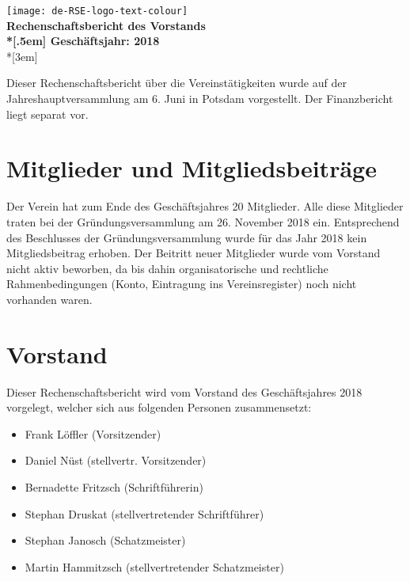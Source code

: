 \newcommand{\jahr}{2018}



\thispagestyle{empty}

\begin{centering}
\texttt{[image: de-RSE-logo-text-colour]}\\
\vspace{3em}
\textbf{
 \Large Rechenschaftsbericht des Vorstands\\*[.5em]
 \normalsize Geschäftsjahr: \jahr}\\*[3em]
\end{centering}



Dieser Rechenschaftsbericht über die Vereinstätigkeiten wurde auf der Jahreshauptversammlung am 6. Juni in Potsdam vorgestellt.
Der Finanzbericht liegt separat vor.

\section{Mitglieder und Mitgliedsbeiträge}

Der Verein hat zum Ende des Geschäftsjahres 20 Mitglieder.
Alle diese Mitglieder traten bei der Gründungsversammlung am 26. November 2018 ein.
Entsprechend des Beschlusses der Gründungsversammlung wurde für das Jahr 2018 kein Mitgliedsbeitrag erhoben.
Der Beitritt neuer Mitglieder wurde vom Vorstand nicht aktiv beworben, da bis dahin organisatorische und rechtliche Rahmenbedingungen (Konto, Eintragung ins Vereinsregister) noch nicht vorhanden waren.

\section{Vorstand}

Dieser Rechenschaftsbericht wird vom Vorstand des Geschäftsjahres 2018 vorgelegt, welcher sich aus folgenden Personen zusammensetzt:

\begin{itemize}
  \item Frank Löffler (Vorsitzender)
  \item Daniel Nüst (stellvertr. Vorsitzender)
  \item Bernadette Fritzsch (Schriftführerin)
  \item Stephan Druskat (stellvertretender Schriftführer)
  \item Stephan Janosch (Schatzmeister)
  \item Martin Hammitzsch (stellvertretender Schatzmeister)
\end{itemize}

